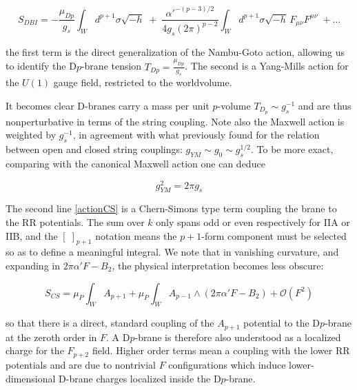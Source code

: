 \begin{equation}
	S_{DBI} = -\frac{\mu_{Dp}}{g_s} \int_W d^{p+1} \sigma \sqrt{-h} \; + \; \frac{\alpha'^{-(p-3)/2}}{4 g_s (2\pi)^{p-2} } \int_W d^{p+1} \sigma \sqrt{-h} \, F_{\mu\nu} F^{\mu\nu} \;+  \dots
	\label{DBIexpanded}
\end{equation}

the first term is the direct generalization of the Nambu-Goto action, allowing us to identify the D$p$-brane tension $T_{Dp} = \frac{\mu_{Dp}}{g_s}$. The second is a Yang-Mills action for the $U(1)$ gauge field, restricted to the worldvolume.

It becomes clear D-branes carry a mass per unit $p$-volume $T_{D_p} \sim g_s^{-1}$ and are thus nonperturbative in terms of the string coupling. Note also the Maxwell action is weighted by $g_s^{-1}$, in agreement with what previously found for the relation between open and closed string couplings: $g_{YM} \sim g_0 \sim g_s^{1/2}$. To be more exact, comparing with the canonical Maxwell action one can deduce

\begin{equation}
	g_{YM}^2 = 2\pi g_s
	\label{gymgs}
\end{equation}

The second line \eqref{actionCS} is a Chern-Simons type term coupling the brane to the RR potentials. The sum over $k$ only spans odd or even respectively for IIA or IIB, and the $\left[ \; \right]_{p+1}$ notation means the $p+1$-form component must be selected so as to define a meaningful integral. We note that in vanishing curvature, and expanding in $2\pi\alpha'F-B_2$, the physical interpretation becomes less obscure:

\begin{equation}
	S_{CS} = \mu_P \int_W A_{p+1} + \mu_P \int_W A_{p-1} \wedge (2\pi\alpha'F - B_2) + \mathcal{O}(F^2)\label{} \end{equation}

so that there is a direct, standard coupling of the $A_{p+1}$ potential to the D$p$-brane at the zeroth order in $F$. A D$p$-brane is therefore also understood as a localized charge for the $F_{p+2}$ field. Higher order terms mean a coupling with the lower RR potentials and are due to nontrivial $F$ configurations which induce lower-dimensional D-brane charges localized inside the D$p$-brane.


